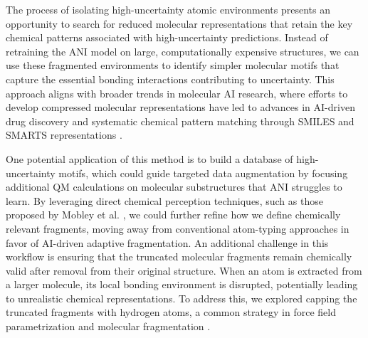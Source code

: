 

The process of isolating high-uncertainty atomic environments presents an opportunity to search for reduced molecular representations that retain the key chemical patterns associated with high-uncertainty predictions. Instead of retraining the ANI model on large, computationally expensive structures, we can use these fragmented environments to identify simpler molecular motifs that capture the essential bonding interactions contributing to uncertainty. This approach aligns with broader trends in molecular AI research, where efforts to develop compressed molecular representations have led to advances in AI-driven drug discovery \cite{mol_reps_in_AI_drug_discovery_david} and systematic chemical pattern matching through SMILES and SMARTS representations \cite{SMILES_pair_encoding_li, mol_patterns_SMARTS_schmidt, automated_fragment_gen_smiles_bilsland}.

One potential application of this method is to build a database of high-uncertainty motifs, which could guide targeted data augmentation by focusing additional QM calculations on molecular substructures that ANI struggles to learn. By leveraging direct chemical perception techniques, such as those proposed by Mobley et al. \cite{direct_chem_perception_mobley}, we could further refine how we define chemically relevant fragments, moving away from conventional atom-typing approaches in favor of AI-driven adaptive fragmentation. An additional challenge in this workflow is ensuring that the truncated molecular fragments remain chemically valid after removal from their original structure. When an atom is extracted from a larger molecule, its local bonding environment is disrupted, potentially leading to unrealistic chemical representations. To address this, we explored capping the truncated fragments with hydrogen atoms, a common strategy in force field parametrization and molecular fragmentation \cite{protein_ff_fragmentation_nn_wang}.

